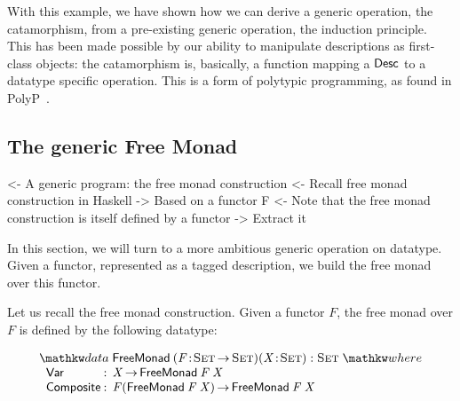 With this example, we have shown how we can derive a generic
operation, the catamorphism, from a pre-existing generic operation,
the induction principle. This has been made possible by our ability to
manipulate descriptions as first-class objects: the catamorphism is,
basically, a function mapping a $\Desc$ to a datatype specific
operation. This is a form of polytypic programming, as found in
PolyP~\cite{jansson:polyp}.


\subsection{The generic Free Monad}
\label{sec:desc-free-monad}

\begin{wstructure}
<- A generic program: the free monad construction
    <- Recall free monad construction in Haskell
        -> Based on a functor F
    <- Note that the free monad construction is itself defined by a functor
        -> Extract it
\end{wstructure}

In this section, we will turn to a more ambitious generic operation on
datatype. Given a functor, represented as a tagged description, we
build the free monad over this functor.

\newcommand{\FMFreeMonad}{\D{FreeMonad}}
\newcommand{\FMFreeMonadD}{\D{FreeMonadD}}
\newcommand{\FMVar}{\C{Var}}
\newcommand{\FMComposite}{\C{Composite}}

Let us recall the free monad construction. Given a functor $F$, the
free monad over $F$ is defined by the following datatype:

\[
\stk{
\data \FMFreeMonad\: \PITEL{\V{F}}{\Set \To \Set} 
                     \PITEL{\V{X}}{\Set} :
                     \Set 
\where \\
\;\;\begin{array}{@{}l@{\::\:\:}l@{\quad}l}
    \FMVar           & \V{X} \To \FMFreeMonad\: \V{F}\: \V{X}                            \\
    \FMComposite     & \V{F} (\FMFreeMonad\: \V{F}\: \V{X}) \To \FMFreeMonad\: \V{F}\: \V{X}    
\end{array}
}
\]

